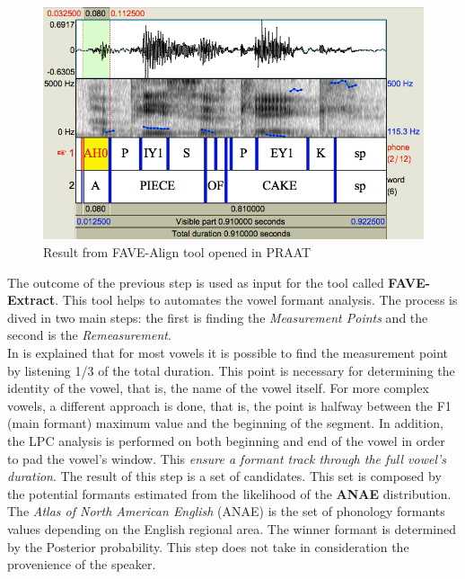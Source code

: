 \begin{figure}[!ht]
	\centering
	\includegraphics[scale=0.5]{Figures/fave_align.png}
	\caption{Result from FAVE-Align tool opened in PRAAT}
	\label{fig:fave-align_result}
\end{figure}

\noindent The outcome of the previous step is used as input for the tool called \textbf{FAVE-Extract}. This tool helps to automates the vowel formant analysis. The process is dived in two main steps: the first is finding the \textit{Measurement Points} and the second is the \textit{Remeasurement}. \\

\noindent In \cite{rosenfelder2011fave} is explained that for most vowels it is possible to find the measurement point by listening 1/3 of the total duration. This point is necessary for determining the identity of the vowel, that is, the name of the vowel itself. For more complex vowels, a different approach is done, that is, the point is halfway between the F1 (main formant) maximum value and the beginning of the segment. In addition, the LPC analysis is performed on both beginning and end of the vowel in order to pad the vowel's window. This \emph{ensure a formant track through the full vowel's duration}\cite{harrison2004variability}. The result of this step is a set of candidates. This set is composed by the potential formants estimated from the likelihood of the \textbf{ANAE} distribution. The \textit{Atlas of North American English} (ANAE) is the set of phonology formants values depending on the English regional area. The winner formant is determined by the Posterior probability. This step does not take in consideration the provenience of the speaker. \\

